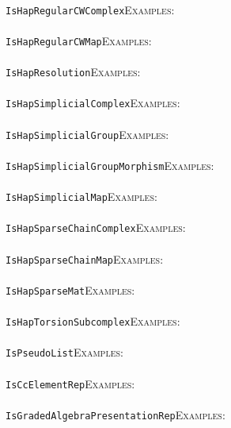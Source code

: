 \documentclass[a4paper,11pt]{report}
\begin{document}
{{ \\
 \texttt{IsHapRegularCWComplex}{\nobreakspace}{\nobreakspace}{\nobreakspace}{\nobreakspace}\textsc{Examples:} \\
 \\
 \texttt{IsHapRegularCWMap}{\nobreakspace}{\nobreakspace}{\nobreakspace}{\nobreakspace}\textsc{Examples:} \\
 \\
 \texttt{IsHapResolution}{\nobreakspace}{\nobreakspace}{\nobreakspace}{\nobreakspace}\textsc{Examples:} \\
 \\
 \texttt{IsHapSimplicialComplex}{\nobreakspace}{\nobreakspace}{\nobreakspace}{\nobreakspace}\textsc{Examples:} \\
 \\
 \texttt{IsHapSimplicialGroup}{\nobreakspace}{\nobreakspace}{\nobreakspace}{\nobreakspace}\textsc{Examples:} \\
 \\
 \texttt{IsHapSimplicialGroupMorphism}{\nobreakspace}{\nobreakspace}{\nobreakspace}{\nobreakspace}\textsc{Examples:} \\
 \\
 \texttt{IsHapSimplicialMap}{\nobreakspace}{\nobreakspace}{\nobreakspace}{\nobreakspace}\textsc{Examples:} \\
 \\
 \texttt{IsHapSparseChainComplex}{\nobreakspace}{\nobreakspace}{\nobreakspace}{\nobreakspace}\textsc{Examples:} \\
 \\
 \texttt{IsHapSparseChainMap}{\nobreakspace}{\nobreakspace}{\nobreakspace}{\nobreakspace}\textsc{Examples:} \\
 \\
 \texttt{IsHapSparseMat}{\nobreakspace}{\nobreakspace}{\nobreakspace}{\nobreakspace}\textsc{Examples:} \\
 \\
 \texttt{IsHapTorsionSubcomplex}{\nobreakspace}{\nobreakspace}{\nobreakspace}{\nobreakspace}\textsc{Examples:} \\
 \\
 \texttt{IsPseudoList}{\nobreakspace}{\nobreakspace}{\nobreakspace}{\nobreakspace}\textsc{Examples:} \\
 \\
 \texttt{IsCcElementRep}{\nobreakspace}{\nobreakspace}{\nobreakspace}{\nobreakspace}\textsc{Examples:} \\
 \\
 \texttt{IsGradedAlgebraPresentationRep}{\nobreakspace}{\nobreakspace}{\nobreakspace}{\nobreakspace}\textsc{Examples:} \\
}}
\end{document}

